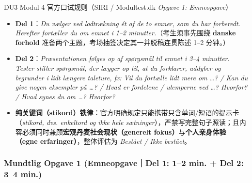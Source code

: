 
\begin{tipbox}{DU3 Modul 4 官方口试规则（SIRI / Modultest.dk \textit{Opgave 1: Emneopgave}）}
\small
\begin{itemize}
  \item \textbf{Del 1}：\textit{Du vælger ved lodtrækning ét af de to emner, som du har forberedt. Herefter fortæller du om emnet i 1--2 minutter.}（考生须事先围绕 \textbf{danske forhold} 准备两个主题，考场抽签决定其一并脱稿连贯陈述 1--2 分钟。）
  \item \textbf{Del 2}：\textit{Præsentationen følges op af spørgsmål til emnet i 3--4 minutter. Tester stiller spørgsmål, der lægger op til, at du forklarer, uddyber og begrunder i lidt længere taleture, fx: Vil du fortælle lidt mere om …? / Kan du give nogen eksempler på …? / Hvad er fordelene / ulemperne ved …? Hvorfor? / Hvad synes du om …? Hvorfor?}
  \item \textbf{纯关键词（stikord）铁律}：官方明确规定只能携带只含单词/短语的提示卡（\textit{stikord, dvs. enkeltord og ikke hele sætninger}），严禁写完整句子照读；且内容必须同时兼顾\textbf{宏观丹麦社会现状（generelt fokus）}与\textbf{个人亲身体验（egne erfaringer）}，整体评估为 \textit{Bestået / Ikke bestået}。
\end{itemize}
\end{tipbox}

\clearpage
\subsubsection*{Mundtlig Opgave 1 (Emneopgave｜Del 1: 1--2 min. + Del 2: 3--4 min.)}

